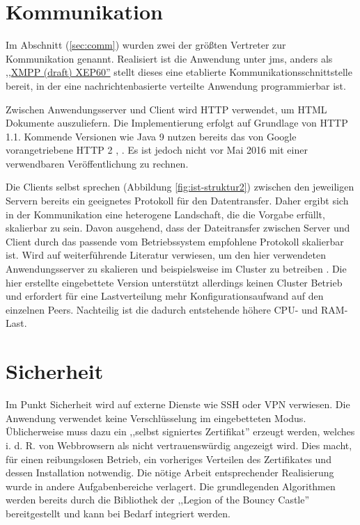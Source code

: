 \documentclass[oneside, ngerman, toc=bibliography,bibliography=totoc,listof=entryprefix, open=right,numbers=noenddot,fontsize=12pt]{scrbook}
\begin{document}
\section{Kommunikation}
Im Abschnitt (\ref{sec:comm}) wurden zwei der größten Vertreter zur Kommunikation genannt. Realisiert ist die Anwendung unter \acrshort{jms}, anders als  \href{http://xmpp.org/extensions/xep-0060.html}{,,XMPP (draft) XEP60''} stellt dieses eine etablierte Kommunikationsschnittstelle bereit, in der eine nachrichtenbasierte verteilte Anwendung programmierbar ist.

Zwischen Anwendungsserver und Client wird HTTP verwendet, um HTML Dokumente auszuliefern. Die Implementierung erfolgt auf Grundlage von HTTP 1.1. Kommende Versionen wie Java 9 nutzen bereits das von Google vorangetriebene HTTP 2 \cite{httpx1}, \cite{httpx2}. Es ist jedoch nicht vor Mai 2016 mit einer verwendbaren Veröffentlichung zu rechnen.

Die Clients selbst sprechen  (Abbildung \ref{fig:ist-struktur2}) zwischen den jeweiligen Servern bereits ein geeignetes Protokoll für den Datentransfer. Daher ergibt sich in der Kommunikation eine heterogene Landschaft, die die Vorgabe erfüllt, skalierbar zu sein. Davon ausgehend, dass der Dateitransfer zwischen Server und Client durch das passende vom Betriebssystem empfohlene Protokoll skalierbar ist. Wird auf weiterführende Literatur verwiesen, um den hier verwendeten Anwendungsserver zu skalieren und beispielsweise im Cluster zu betreiben \cite{glassfishcluster}.
Die hier erstellte eingebettete Version unterstützt allerdings keinen Cluster Betrieb und erfordert für eine Lastverteilung mehr Konfigurationsaufwand auf den einzelnen Peers. Nachteilig ist die dadurch entstehende höhere CPU- und RAM-Last.
 
\section{Sicherheit}
Im Punkt Sicherheit wird auf externe Dienste wie SSH oder VPN verwiesen.
Die Anwendung verwendet keine Verschlüsselung im eingebetteten Modus. Üblicherweise muss dazu ein ,,selbst signiertes Zertifikat'' erzeugt werden, welches i. d. R. von Webbrowsern als nicht vertrauenswürdig angezeigt wird. Dies macht, für einen reibungslosen Betrieb, ein vorheriges Verteilen des Zertifikates und dessen Installation notwendig. Die nötige Arbeit entsprechender Realisierung wurde in andere Aufgabenbereiche verlagert. Die grundlegenden Algorithmen werden bereits durch die Bibliothek der ,,Legion of the Bouncy Castle'' bereitgestellt und kann bei Bedarf integriert werden\cite{javabc}.
\end{document}
